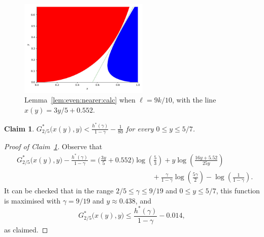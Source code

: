 \documentclass[12pt,reqno]{amsart}
\newtheorem{claim}[theorem]{Claim}
\theoremstyle{definition}
\theoremstyle{remark}
\newenvironment{clmproof}[1]{\begin{proof}[Proof of Claim~\ref{#1}]\let\qednow\qedsymbol\renewcommand{\qedsymbol}{}}{\; \qednow \end{proof}}
\renewcommand{\le}{\leqslant}
\begin{document}
\begin{figure}[h]
\centering
\includegraphics[width=0.55\textwidth]{Figure_offdiag_ninetenths_line.jpeg}
    \caption{Lemma~\ref{lem:even:nearer:calc} when $\ell = 9k/10$, with the line $x(y) = 3y/5 + 0.552$.}
\label{fig:ninetenths:app}
\end{figure}


\begin{claim}\label{claim:AppC:G}
$G_{2/5}^*\big(x(y),y \big) < \displaystyle\frac{h^*(\gamma)}{1-\gamma} - \frac{1}{80}$ for every $0 \le y \le 5/7$. 
\end{claim}
 
\begin{clmproof}{claim:AppC:G}
Observe that
\begin{align*}
& G_{2/5}^*\big( x(y),y \big) - \frac{h^*(\gamma)}{1-\gamma} = \bigg( \frac{3y}{5} + 0.552 \bigg) \log \left(\frac{5}{3} \right) + y \log \left( \frac{16y + 5.52}{25y} \right)\\
& \hspace{8cm} + \frac{\gamma}{1-\gamma} \log \left( \frac{5\gamma}{2} \right) - \log \left(\frac{1}{1 - \gamma}\right).
\end{align*}
It can be checked that in the range $2/5 \le \gamma \le 9/19$ and $0 \le y \le 5/7$, this function is maximised with $\gamma = 9/19$ and $y \approx 0.438$, and 
$$G_{2/5}^*\big( x(y),y \big) \le \frac{h^*(\gamma)}{1-\gamma} - 0.014,$$
as claimed. 
\end{clmproof}
\end{document}
